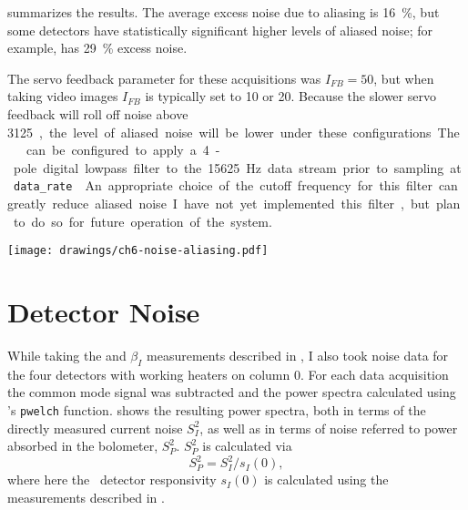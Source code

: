  summarizes the results.
The average excess noise due to aliasing is \SI{16}{\percent}, but some detectors have statistically significant higher levels of aliased noise; for example,  has \SI{29}{\percent} excess noise.

The servo feedback parameter for these acquisitions was $I_{FB} = 50$, but when taking video images $I_{FB}$ is typically set to 10 or 20.
Because the slower servo feedback will roll off noise above \SI{3125}, the level of aliased noise will be lower under these configurations.

The \MCE\ can be configured to apply a 4-pole digital lowpass filter to the \SI{15625}{\Hz} data stream prior to sampling at \texttt{data\_rate} \cite{mce_team_digital_????}.
An appropriate choice of the cutoff frequency for this filter can greatly reduce aliased noise.
I have not yet implemented this filter, but plan to do so for future operation of the system.

\begin{figure*}
  \centering
\texttt{[image: drawings/ch6-noise-aliasing.pdf]}
\caption[Plots showing impact of noise aliasing]{
Plots showing impact of noise aliasing.
\textbf{Left}
Plot showing fractional excess noise (see text for definition) due to noise aliasing for all rows of column 0.
The error bars are for \SI{95}{\percent} confidence intervals, and the median excess noise is \SI{12}{\percent}.
\textbf{Right}
Sample power spectra at \SI{3125}{\hertz} and \SI{15625}{\hertz} for .
For this detector the excess noise is \SI{17}{\percent}.
}
\label{fig:ch6-noise-aliasing}
\end{figure*}

\section{Detector Noise} \label{sec:det-noise}

While taking the \Loop and $\beta_I$ measurements described in , I also took noise data for the four detectors with working heaters on column 0.
For each data acquisition the common mode signal was subtracted and the power spectra calculated using \MATLAB's \texttt{pwelch} function.
 shows the resulting power spectra, both in terms of the directly measured current noise $S^2_I$, as well as in terms of noise referred to power absorbed in the bolometer, $S^2_{P}$.
$S^2_{P}$ is calculated via
\begin{equation}
 S^2_{P} = S^2_I / s_I(0),
\end{equation}
where here the \DC\ detector responsivity $s_I(0)$ is calculated using the measurements described in .


